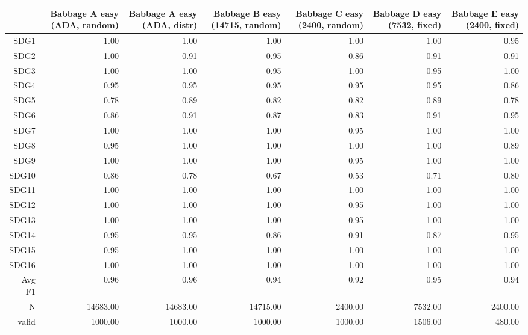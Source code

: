 \begin{table}[ht]
\centering
\begin{tabular}{rrrrrrr}
  \hline
 & Babbage A easy (ADA, random) & Babbage A easy (ADA, distr) & Babbage B easy (14715, random) & Babbage C easy (2400, random) & Babbage D easy (7532, fixed) & Babbage E easy (2400, fixed) \\ 
  \hline
SDG1 & 1.00 & 1.00 & 1.00 & 1.00 & 1.00 & 0.95 \\ 
  SDG2 & 1.00 & 0.91 & 0.95 & 0.86 & 0.91 & 0.91 \\ 
  SDG3 & 1.00 & 1.00 & 0.95 & 1.00 & 0.95 & 1.00 \\ 
  SDG4 & 0.95 & 0.95 & 0.95 & 0.95 & 0.95 & 0.86 \\ 
  SDG5 & 0.78 & 0.89 & 0.82 & 0.82 & 0.89 & 0.78 \\ 
  SDG6 & 0.86 & 0.91 & 0.87 & 0.83 & 0.91 & 0.95 \\ 
  SDG7 & 1.00 & 1.00 & 1.00 & 0.95 & 1.00 & 1.00 \\ 
  SDG8 & 0.95 & 1.00 & 1.00 & 1.00 & 1.00 & 0.89 \\ 
  SDG9 & 1.00 & 1.00 & 1.00 & 0.95 & 1.00 & 1.00 \\ 
  SDG10 & 0.86 & 0.78 & 0.67 & 0.53 & 0.71 & 0.80 \\ 
  SDG11 & 1.00 & 1.00 & 1.00 & 1.00 & 1.00 & 1.00 \\ 
  SDG12 & 1.00 & 1.00 & 1.00 & 0.95 & 1.00 & 1.00 \\ 
  SDG13 & 1.00 & 1.00 & 1.00 & 0.95 & 1.00 & 1.00 \\ 
  SDG14 & 0.95 & 0.95 & 0.86 & 0.91 & 0.87 & 0.95 \\ 
  SDG15 & 0.95 & 1.00 & 1.00 & 1.00 & 1.00 & 1.00 \\ 
  SDG16 & 1.00 & 1.00 & 1.00 & 1.00 & 1.00 & 1.00 \\ 
  Avg F1 & 0.96 & 0.96 & 0.94 & 0.92 & 0.95 & 0.94 \\ 
  N & 14683.00 & 14683.00 & 14715.00 & 2400.00 & 7532.00 & 2400.00 \\ 
  valid & 1000.00 & 1000.00 & 1000.00 & 1000.00 & 1506.00 & 480.00 \\ 
   \hline
\end{tabular}
\end{table}
